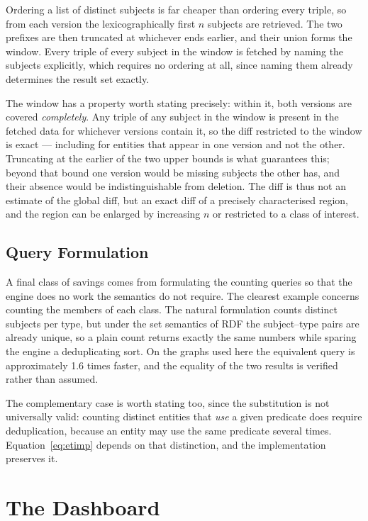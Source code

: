 Ordering a list of
distinct subjects is far cheaper than ordering every triple, so from each version
the lexicographically first $n$ subjects are retrieved. The two prefixes are then
truncated at whichever ends earlier, and their union forms the window. Every
triple of every subject in the window is fetched by naming the subjects
explicitly, which requires no ordering at all, since naming them already
determines the result set exactly.

The window has a property worth stating precisely: within it, both versions are
covered \emph{completely}. Any triple of any subject in the window is present in
the fetched data for whichever versions contain it, so the diff restricted to the
window is exact --- including for entities that appear in one version and not the
other. Truncating at the earlier of the two upper bounds is what guarantees this;
beyond that bound one version would be missing subjects the other has, and their
absence would be indistinguishable from deletion. The diff is thus not an
estimate of the global diff, but an exact diff of a precisely characterised
region, and the region can be enlarged by increasing $n$ or restricted to a class
of interest.

\subsection{Query Formulation}
\label{subsec:query_formulation}

A final class of savings comes from formulating the counting queries so that the
engine does no work the semantics do not require. The clearest example concerns
counting the members of each class. The natural formulation counts distinct
subjects per type, but under the set semantics of RDF the subject--type pairs are
already unique, so a plain count returns exactly the same numbers while sparing
the engine a deduplicating sort. On the graphs used here the equivalent query is
approximately 1.6 times faster, and the equality of the two results is verified
rather than assumed.

The complementary case is worth stating too, since the substitution is not
universally valid: counting distinct entities that \emph{use} a given predicate
does require deduplication, because an entity may use the same predicate several
times. Equation~\ref{eq:etimp} depends on that distinction, and the
implementation preserves it.

\section{The Dashboard}
\label{sec:dashboard}

